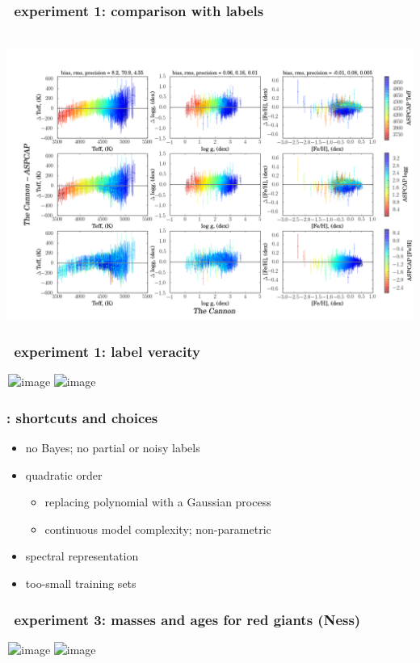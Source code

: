 \documentclass[pdftex]{beamer}
\begin{document}
\results

\begin{frame}
  \frametitle{\tc\ experiment 1: comparison with \textsl{} labels}
  \,\hfill\includegraphics[height=\figureheight]{../documents/paper1/plots/cplot2.png} 
\end{frame}

\begin{frame}
  \frametitle{\tc\ experiment 1: label veracity}
  \,\hfill\includegraphics<1>[height=\figureheight]{../documents/paper1/plots/iso2_2.png}
         \includegraphics<2>[height=\figureheight]{../documents/paper1/plots/iso2a_2.png}
\end{frame}

\results

\begin{frame}
  \frametitle{\tc: shortcuts and choices}
  \begin{itemize}
  \item no Bayes; no partial or noisy labels
  \item quadratic order
    \begin{itemize}
    \item replacing polynomial with a Gaussian process
    \item continuous model complexity; non-parametric
    \end{itemize}
  \item spectral representation
  \item too-small training sets
  \end{itemize}
\end{frame}

\begin{frame}
  \frametitle{\tc\ experiment 3: masses and ages for red giants (Ness)}
  \,\hfill\includegraphics<1>[width=\figurewidth]{6labels_mass.png}%
          \includegraphics<2>[width=\figurewidth]{6labels_age.png}
\end{frame}
\end{document}
